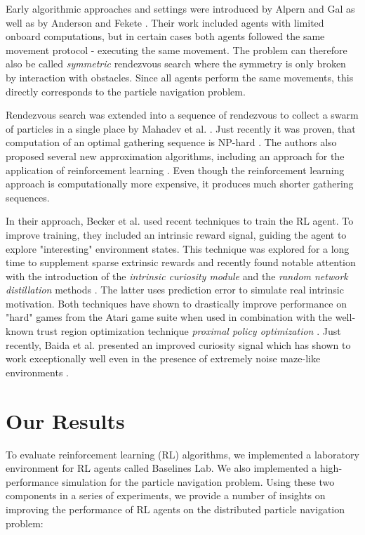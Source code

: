  Early algorithmic approaches and settings were introduced by Alpern and Gal \cite{alpern2006theory} as well as by Anderson and Fekete \cite{anderson2001two}. Their work included agents with limited onboard computations, but in certain cases both agents followed the same movement protocol - executing the same movement. The problem can therefore also be called \textit{symmetric} rendezvous search where the symmetry is only broken by interaction with obstacles. Since all agents perform the same movements, this directly corresponds to the particle navigation problem. 

Rendezvous search was extended into a sequence of rendezvous to collect a swarm of particles in a single place by Mahadev et al. \cite{mahadev2016collecting}. Just recently it was proven, that computation of an optimal gathering sequence is NP-hard \cite{becker2020}. The authors also proposed several new approximation algorithms, including an approach for the application of reinforcement learning \cite{huang2019, becker2020}. Even though the reinforcement learning approach is computationally more expensive, it produces much shorter gathering sequences.

In their approach, Becker et al. used recent techniques to train the RL agent. To improve training, they included an intrinsic reward signal, guiding the agent to explore "interesting" environment states. This technique was explored for a long time to supplement sparse extrinsic rewards \cite{pathak2017curiosity, mohamed2015variational, houthooft2016variational} and recently found notable attention with the introduction of the \textit{intrinsic curiosity module} \cite{burda2018large} and the \textit{random network distillation} methods \cite{burda2018exploration}. The latter uses prediction error to simulate real intrinsic motivation. Both techniques have shown to drastically improve performance on "hard" games from the Atari game suite when used in combination with the well-known trust region optimization technique \textit{proximal policy optimization} \cite{schulman2017proximal}. Just recently, Baida et al. presented an improved curiosity signal which has shown to work exceptionally well even in the presence of extremely noise maze-like environments \cite{badia2020never}.

\section{Our Results} \label{sec:Results}
To evaluate reinforcement learning (RL) algorithms, we implemented a laboratory environment for RL agents called Baselines Lab. We also implemented a high-performance simulation for the particle navigation problem. Using these two components in a series of experiments, we provide a number of insights on improving the performance of RL agents on the distributed particle navigation problem:

